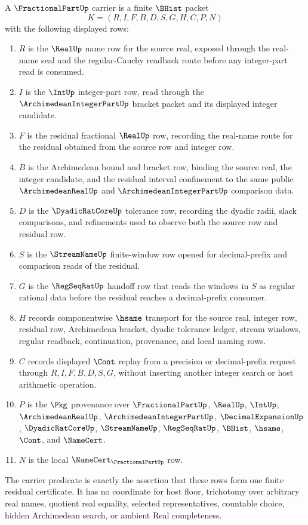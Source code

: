 \begin{definition}
\label{def:fractional-part-carrier}
A $\FractionalPartUp$ carrier is a finite $\BHist$ packet
$$
K=(R,I,F,B,D,S,G,H,C,P,N)
$$
with the following displayed rows:
\begin{enumerate}
\item $R$ is the $\RealUp$ name row for the source real, exposed through the real-name seal and the regular-Cauchy readback route before any integer-part read is consumed.
\item $I$ is the $\IntUp$ integer-part row, read through the $\ArchimedeanIntegerPartUp$ bracket packet and its displayed integer candidate.
\item $F$ is the residual fractional $\RealUp$ row, recording the real-name route for the residual obtained from the source row and integer row.
\item $B$ is the Archimedean bound and bracket row, binding the source real, the integer candidate, and the residual interval confinement to the same public $\ArchimedeanRealUp$ and $\ArchimedeanIntegerPartUp$ comparison data.
\item $D$ is the $\DyadicRatCoreUp$ tolerance row, recording the dyadic radii, slack comparisons, and refinements used to observe both the source row and residual row.
\item $S$ is the $\StreamNameUp$ finite-window row opened for decimal-prefix and comparison reads of the residual.
\item $G$ is the $\RegSeqRatUp$ handoff row that reads the windows in $S$ as regular rational data before the residual reaches a decimal-prefix consumer.
\item $H$ records componentwise $\hsame$ transport for the source real, integer row, residual row, Archimedean bracket, dyadic tolerance ledger, stream windows, regular readback, continuation, provenance, and local naming rows.
\item $C$ records displayed $\Cont$ replay from a precision or decimal-prefix request through $R,I,F,B,D,S,G$, without inserting another integer search or host arithmetic operation.
\item $P$ is the $\Pkg$ provenance over $\FractionalPartUp$, $\RealUp$, $\IntUp$, $\ArchimedeanRealUp$, $\ArchimedeanIntegerPartUp$, $\DecimalExpansionUp$, $\DyadicRatCoreUp$, $\StreamNameUp$, $\RegSeqRatUp$, $\BHist$, $\hsame$, $\Cont$, and $\NameCert$.
\item $N$ is the local $\NameCert_{\FractionalPartUp}$ row.
\end{enumerate}
The carrier predicate is exactly the assertion that these rows form one finite residual certificate. It has no coordinate for host floor, trichotomy over arbitrary real names, quotient real equality, selected representatives, countable choice, hidden Archimedean search, or ambient Real completeness.
\end{definition}

